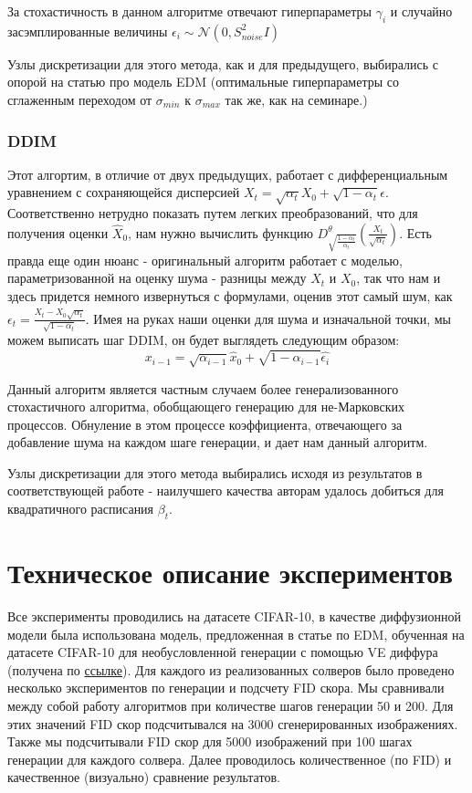 \documentclass[a4paper]{article}
\begin{document}
    За стохастичность в данном алгоритме отвечают гиперпараметры $\gamma_i$ и случайно засэмплированные величины $\epsilon_i \sim \mathcal{N}(0, S^2_{noise} I)$

    Узлы дискретизации для этого метода, как и для предыдущего, выбирались с опорой на статью про модель EDM (оптимальные гиперпараметры со сглаженным переходом от $\sigma_{min}$ к $\sigma_{max}$ так же, как на семинаре.)

    \subsubsection{DDIM}

    Этот алгортим, в отличие от двух предыдущих, работает с дифференциальным уравнением с сохраняющейся дисперсией $X_t = \sqrt{\alpha_t}X_0 + \sqrt{1 - \alpha_t}\epsilon$. Соответственно нетрудно показать путем легких преобразований, что для получения оценки $\hat{X}_0$, нам нужно вычислить функцию $D^{\theta}_{\sqrt{\frac{1 - \alpha_t}{\alpha_t}}}(\frac{X_{t}}{\sqrt{\alpha_t}})$. Есть правда еще один нюанс - оригинальный алгоритм работает с моделью, параметризованной на оценку шума - разницы между $X_t$ и $X_0$, так что нам и здесь придется немного извернуться с формулами, оценив этот самый шум, как $\hat{\epsilon_t} = \frac{X_t - \hat{X}_0 \sqrt{\alpha_t}}{\sqrt{1 - \alpha_t}}$. Имея на руках наши оценки для шума и изначальной точки, мы можем выписать шаг DDIM, он будет выглядеть следующим образом:
    $$x_{i-1} = \sqrt{\alpha_{i-1}} \hat{x}_0 + \sqrt{1 - \alpha_{i-1}}\hat{\epsilon_i}$$

    Данный алгоритм является частным случаем более генерализованного стохастичного алгоритма, обобщающего генерацию для не-Марковских процессов. Обнуление в этом процессе коэффициента, отвечающего за добавление шума на каждом шаге генерации, и дает нам данный алгоритм.

    Узлы дискретизации для этого метода выбирались исходя из результатов в соответствующей работе - наилучшего качества авторам удалось добиться для квадратичного расписания $\beta_{t}$.

    \section{Техническое описание экспериментов}
    Все эксперименты проводились на датасете CIFAR-10, в качестве диффузионной модели была использована модель, предложенная в статье по EDM, обученная на датасете CIFAR-10 для необусловленной генерации с помощью VE диффура (получена по \href{https://nvlabs-fi-cdn.nvidia.com/edm/pretrained/}{ссылке}).
    Для каждого из реализованных солверов было проведено несколько экспериментов по генерации и подсчету FID скора. Мы сравнивали между собой работу алгоритмов при количестве шагов генерации 50 и 200. Для этих значений FID скор подсчитывался на 3000 сгенерированных изображениях. Также мы подсчитывали FID скор для 5000 изображений при 100 шагах генерации для каждого солвера. Далее проводилось количественное (по FID) и качественное (визуально) сравнение результатов.
\end{document}
